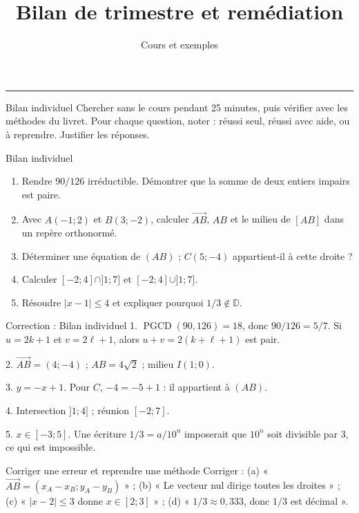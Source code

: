 \documentclass[aspectratio=169,10pt]{beamer}
\title{Bilan de trimestre et remédiation}
\subtitle{Cours et exemples}
\date{}
\author{}
\providecommand{\D}{\mathbb{D}}
\providecommand{\vect}[1]{\overrightarrow{#1}}
\begin{document}
\begin{frame}[plain]
\vfill
{\inserttitle\par}
\medskip
{\insertsubtitle\par}
\medskip
{\rule{\textwidth}{.5pt}}
\vfill
\end{frame}
\begin{frame}{Bilan individuel}
Chercher sans le cours pendant 25 minutes, puis vérifier avec les méthodes du livret. Pour chaque question, noter : réussi seul, réussi avec aide, ou à reprendre. Justifier les réponses.
\end{frame}
\begin{frame}{Bilan individuel}
\begin{enumerate}
\setcounter{enumi}{0}
\item Rendre \(90/126\) irréductible. Démontrer que la somme de deux entiers impairs est paire.

\item Avec \(A(-1;2)\) et \(B(3;-2)\), calculer \(\vect{AB}\), \(AB\) et le milieu de \([AB]\) dans un repère orthonormé.

\item Déterminer une équation de \((AB)\) ; \(C(5;-4)\) appartient-il à cette droite ?

\item Calculer \([-2;4]\cap]1;7]\) et \([-2;4]\cup]1;7]\).

\item Résoudre \(|x-1|\leq4\) et expliquer pourquoi \(1/3\notin\D\).

\end{enumerate}
\end{frame}
\begin{frame}{Correction : Bilan individuel}
1. \(\operatorname{PGCD}(90,126)=18\), donc \(90/126=5/7\). Si \(u=2k+1\) et \(v=2\ell+1\), alors \(u+v=2(k+\ell+1)\) est pair.

2. \(\vect{AB}=(4;-4)\) ; \(AB=4\sqrt2\) ; milieu \(I(1;0)\).

3. \(y=-x+1\). Pour \(C\), \(-4=-5+1\) : il appartient à \((AB)\).

4. Intersection \(]1;4]\) ; réunion \([-2;7]\).

5. \(x\in[-3;5]\). Une écriture \(1/3=a/10^n\) imposerait que \(10^n\) soit divisible par \(3\), ce qui est impossible.
\end{frame}
\begin{frame}{Corriger une erreur et reprendre une méthode}
Corriger : (a) « \(\vect{AB}=(x_A-x_B;y_A-y_B)\) » ; (b) « Le vecteur nul dirige toutes les droites » ; (c) « \(|x-2|\leq3\) donne \(x\in[2;3]\) » ; (d) « \(1/3\approx0{,}333\), donc \(1/3\) est décimal ».
\end{frame}
\end{document}
